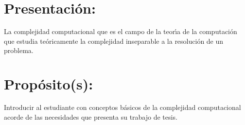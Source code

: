 \section{Presentaci\'{o}n:}

La complejidad computacional que es el campo de la teor\'{\i}a de la
computaci\'{o}n que estudia te\'{o}ricamente la complejidad inseparable a la
resoluci\'{o}n de un problema.

\section{Prop\'{o}sito(s):}

Introducir al estudiante con conceptos b\'{a}sicos de la complejidad
computacional acorde de las necesidades que presenta su trabajo de
tesis.

